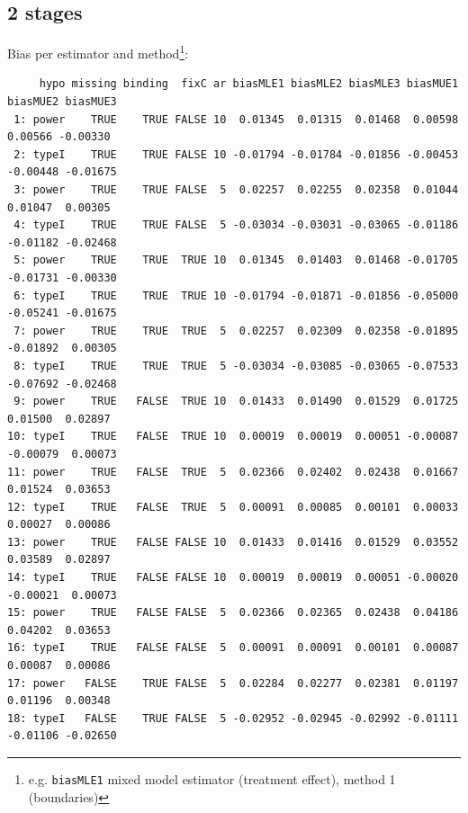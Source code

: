 \documentclass[12pt]{article}
\begin{document}
\subsection{2 stages}
\label{sec:org42bf538}
Bias per estimator and method\footnote{e.g. \texttt{biasMLE1} mixed model
estimator (treatment effect), method 1 (boundaries)}:
\begin{adjustwidth}{-1cm}{-1cm}
\begin{verbatim}
     hypo missing binding  fixC ar biasMLE1 biasMLE2 biasMLE3 biasMUE1 biasMUE2 biasMUE3
 1: power    TRUE    TRUE FALSE 10  0.01345  0.01315  0.01468  0.00598  0.00566 -0.00330
 2: typeI    TRUE    TRUE FALSE 10 -0.01794 -0.01784 -0.01856 -0.00453 -0.00448 -0.01675
 3: power    TRUE    TRUE FALSE  5  0.02257  0.02255  0.02358  0.01044  0.01047  0.00305
 4: typeI    TRUE    TRUE FALSE  5 -0.03034 -0.03031 -0.03065 -0.01186 -0.01182 -0.02468
 5: power    TRUE    TRUE  TRUE 10  0.01345  0.01403  0.01468 -0.01705 -0.01731 -0.00330
 6: typeI    TRUE    TRUE  TRUE 10 -0.01794 -0.01871 -0.01856 -0.05000 -0.05241 -0.01675
 7: power    TRUE    TRUE  TRUE  5  0.02257  0.02309  0.02358 -0.01895 -0.01892  0.00305
 8: typeI    TRUE    TRUE  TRUE  5 -0.03034 -0.03085 -0.03065 -0.07533 -0.07692 -0.02468
 9: power    TRUE   FALSE  TRUE 10  0.01433  0.01490  0.01529  0.01725  0.01500  0.02897
10: typeI    TRUE   FALSE  TRUE 10  0.00019  0.00019  0.00051 -0.00087 -0.00079  0.00073
11: power    TRUE   FALSE  TRUE  5  0.02366  0.02402  0.02438  0.01667  0.01524  0.03653
12: typeI    TRUE   FALSE  TRUE  5  0.00091  0.00085  0.00101  0.00033  0.00027  0.00086
13: power    TRUE   FALSE FALSE 10  0.01433  0.01416  0.01529  0.03552  0.03589  0.02897
14: typeI    TRUE   FALSE FALSE 10  0.00019  0.00019  0.00051 -0.00020 -0.00021  0.00073
15: power    TRUE   FALSE FALSE  5  0.02366  0.02365  0.02438  0.04186  0.04202  0.03653
16: typeI    TRUE   FALSE FALSE  5  0.00091  0.00091  0.00101  0.00087  0.00087  0.00086
17: power   FALSE    TRUE FALSE  5  0.02284  0.02277  0.02381  0.01197  0.01196  0.00348
18: typeI   FALSE    TRUE FALSE  5 -0.02952 -0.02945 -0.02992 -0.01111 -0.01106 -0.02650
\end{verbatim}
\end{adjustwidth}
\end{document}
